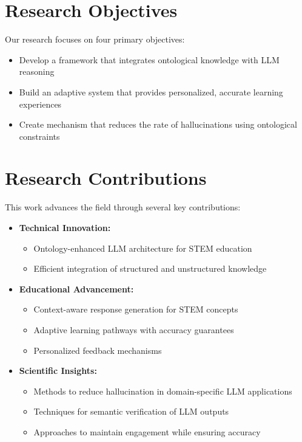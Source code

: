 \section{Research Objectives}

Our research focuses on four primary objectives:

\begin{itemize}
    \item Develop a framework that integrates ontological knowledge with LLM reasoning
    \item Build an adaptive system that provides personalized, accurate learning experiences
    \item Create mechanism that reduces the rate of hallucinations using ontological constraints
\end{itemize}

\section{Research Contributions}

This work advances the field through several key contributions:

\begin{itemize}
    \item \textbf{Technical Innovation:}
        \begin{itemize}
            \item Ontology-enhanced LLM architecture for STEM education
            \item Efficient integration of structured and unstructured knowledge
        \end{itemize}
    
    \item \textbf{Educational Advancement:}
        \begin{itemize}
            \item Context-aware response generation for STEM concepts
            \item Adaptive learning pathways with accuracy guarantees
            \item Personalized feedback mechanisms
        \end{itemize}
    
    \item \textbf{Scientific Insights:}
        \begin{itemize}
            \item Methods to reduce hallucination in domain-specific LLM applications
            \item Techniques for semantic verification of LLM outputs
            \item Approaches to maintain engagement while ensuring accuracy
        \end{itemize}
\end{itemize}

